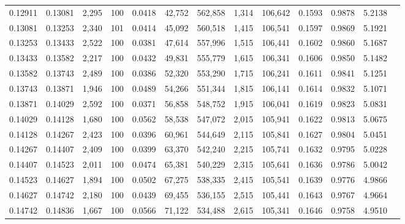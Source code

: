 \begin{tabular}{rrrrrrrrrrrrr}
0.12911 & 0.13081 & 2,295 & 100 &                                     0.0418 &  42,752 & 562,858 &   1,314 & 106,642 & 0.1593 & 0.9878 & 5.2138 \\
0.13081 & 0.13253 & 2,340 & 101 &                                     0.0414 &  45,092 & 560,518 &   1,415 & 106,541 & 0.1597 & 0.9869 & 5.1921 \\
0.13253 & 0.13433 & 2,522 & 100 &                                     0.0381 &  47,614 & 557,996 &   1,515 & 106,441 & 0.1602 & 0.9860 & 5.1687 \\
0.13433 & 0.13582 & 2,217 & 100 &                                     0.0432 &  49,831 & 555,779 &   1,615 & 106,341 & 0.1606 & 0.9850 & 5.1482 \\
0.13582 & 0.13743 & 2,489 & 100 &                                     0.0386 &  52,320 & 553,290 &   1,715 & 106,241 & 0.1611 & 0.9841 & 5.1251 \\
0.13743 & 0.13871 & 1,946 & 100 &                                     0.0489 &  54,266 & 551,344 &   1,815 & 106,141 & 0.1614 & 0.9832 & 5.1071 \\
0.13871 & 0.14029 & 2,592 & 100 &                                     0.0371 &  56,858 & 548,752 &   1,915 & 106,041 & 0.1619 & 0.9823 & 5.0831 \\
0.14029 & 0.14128 & 1,680 & 100 &                                     0.0562 &  58,538 & 547,072 &   2,015 & 105,941 & 0.1622 & 0.9813 & 5.0675 \\
0.14128 & 0.14267 & 2,423 & 100 &                                     0.0396 &  60,961 & 544,649 &   2,115 & 105,841 & 0.1627 & 0.9804 & 5.0451 \\
0.14267 & 0.14407 & 2,409 & 100 &                                     0.0399 &  63,370 & 542,240 &   2,215 & 105,741 & 0.1632 & 0.9795 & 5.0228 \\
0.14407 & 0.14523 & 2,011 & 100 &                                     0.0474 &  65,381 & 540,229 &   2,315 & 105,641 & 0.1636 & 0.9786 & 5.0042 \\
0.14523 & 0.14627 & 1,894 & 100 &                                     0.0502 &  67,275 & 538,335 &   2,415 & 105,541 & 0.1639 & 0.9776 & 4.9866 \\
0.14627 & 0.14742 & 2,180 & 100 &                                     0.0439 &  69,455 & 536,155 &   2,515 & 105,441 & 0.1643 & 0.9767 & 4.9664 \\
0.14742 & 0.14836 & 1,667 & 100 &                                     0.0566 &  71,122 & 534,488 &   2,615 & 105,341 & 0.1646 & 0.9758 & 4.9510 \\

\end{tabular}

